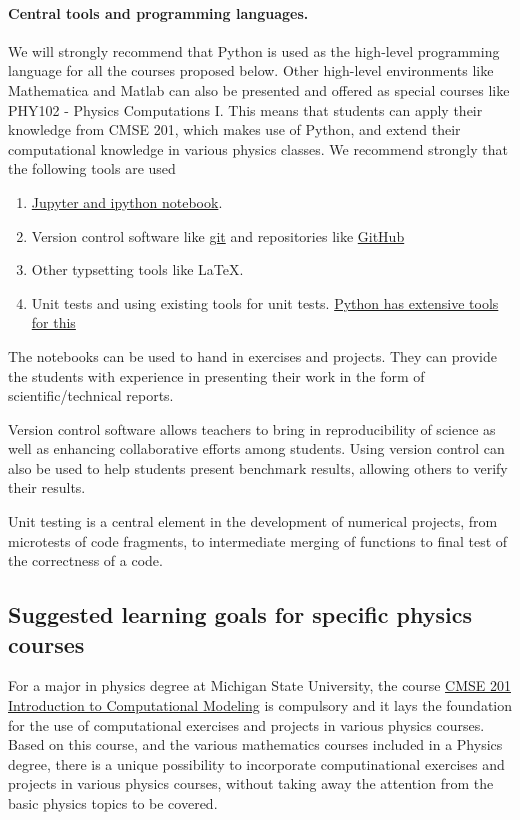 \documentclass[%
oneside,                 %
final,                   %
10pt]{article}
\begin{document}
\paragraph{Central tools and programming languages.}
We will strongly recommend that Python is used as the high-level programming language for all the courses proposed below. Other high-level environments like Mathematica and Matlab can also be presented and offered as special courses like PHY102 - Physics Computations I. This means that students can apply their knowledge from CMSE 201, which makes use of Python, and extend their computational knowledge in various physics classes. We recommend strongly that the following tools are used
\begin{enumerate}
\item \href{{http://jupyter.org/}}{Jupyter and ipython notebook}.

\item Version control software like \href{{https://git-scm.com/}}{git} and repositories like \href{{https://github.com/}}{GitHub}

\item Other typsetting tools like {\LaTeX}.

\item Unit tests and using existing tools for unit tests. \href{{https://docs.python.org/2/library/unittest.html}}{Python has extensive tools for this}
\end{enumerate}

\noindent
The notebooks can be used to hand in exercises and projects. They can provide the students with experience in presenting their work in the form of scientific/technical reports.

Version control software allows teachers to bring in reproducibility of science as well as enhancing
collaborative efforts among students. Using version control can also be used to help students present benchmark results, allowing others to verify their results.

Unit testing is a central element in the development of numerical projects, from microtests of code fragments, to intermediate merging of functions to final test of the correctness of a code.

\subsection{Suggested learning goals for specific physics courses}

For a major in physics degree at Michigan State University, the course \href{{https://cmse.msu.edu/academics/undergraduate-program/undergraduate-courses/cmse-201-introduction-to-computational-modeling/}}{CMSE 201 Introduction to Computational Modeling} is compulsory and it lays the foundation for the use of computational exercises and projects in various physics courses. Based on this course, and the various mathematics courses included in a Physics degree, there is a unique possibility to incorporate computinational exercises and projects in various physics courses, without taking away the attention from the basic physics topics to be covered. 
\end{document}
